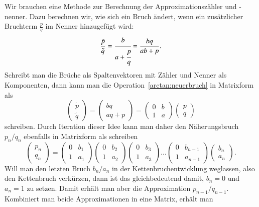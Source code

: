 \begin{refsection}
Wir brauchen eine Methode zur Berechnung der Approximationszähler und -nenner.
Dazu berechnen wir, wie sich ein Bruch ändert, wenn ein zusätzlicher
Bruchterm $\frac{p}{q}$ im Nenner hinzugefügt wird:
\begin{equation}
\frac{\tilde{p}}{\tilde{q}}
=
\cfrac{b}{a+\cfrac{p}{q}}
=
\frac{bq}{ab+p}.
\label{arctan:neuerbruch}
\end{equation}
Schreibt man die Brüche als Spaltenvektoren mit Zähler und Nenner als
Komponenten, dann kann man die Operation~\eqref{arctan:neuerbruch}
in Matrixform als
\[
\begin{pmatrix}
\tilde{p}\\\tilde{q}
\end{pmatrix}
=
\begin{pmatrix}
bq\\
aq+p
\end{pmatrix}
=
\begin{pmatrix}
0&b\\
1&a
\end{pmatrix}
\begin{pmatrix}
p\\
q
\end{pmatrix}
\]
schreiben.
Durch Iteration dieser Idee kann man daher den Näherungsbruch $p_n/q_n$
ebenfalls in Matrixform als schreiben 
\[
\begin{pmatrix}
p_n\\q_n
\end{pmatrix}
=
\begin{pmatrix} 0&b_1\\1&a_1\end{pmatrix}
\begin{pmatrix} 0&b_2\\1&a_2\end{pmatrix}
\begin{pmatrix} 0&b_3\\1&a_3\end{pmatrix}
\dots
\begin{pmatrix} 0&b_{n-1}\\1&a_{n-1}\end{pmatrix}
\begin{pmatrix} b_n\\a_n\end{pmatrix}.
\]
Will man den letzten Bruch $b_n/a_n$ in der Kettenbruchentwicklung
weglassen, also den Kettenbruch verkürzen, dann ist das gleichbedeutend
damit, $b_n=0$ und $a_n=1$ zu setzen.
Damit erhält man aber die Approximation $p_{n-1}/q_{n-1}$.
Kombiniert man beide Approximationen in eine Matrix, erhält man

\end{refsection}
